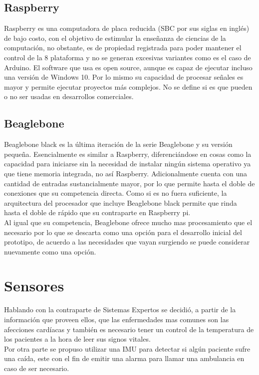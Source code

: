 \subsection{Raspberry}
Raspberry es una computadora de placa reducida (SBC por sus siglas en inglés) de bajo costo, con el objetivo de estimular la enseñanza de ciencias de la computación, no obstante, es de propiedad registrada para poder mantener el control de la 8 plataforma y no se generan excesivas variantes como es el caso de Arduino. El software que usa es open source, aunque es capaz de ejecutar incluso una versión de Windows 10. Por lo mismo su capacidad de procesar señales es mayor y permite ejecutar proyectos más complejos. No se define si es que pueden o no ser usadas en desarrollos comerciales.

\newpage
\subsection{Beaglebone}
Beaglebone black es la última iteración de la serie Beaglebone y su versión pequeña. Esencialmente es similar a Raspberry, diferenciándose en cosas como la capacidad para iniciarse sin la necesidad de instalar ningún sistema operativo ya que tiene memoria integrada, no así Raspberry. Adicionalmente cuenta con una cantidad de entradas sustancialmente mayor, por lo que permite hasta el doble de conexiones que su competencia directa. Como si es no fuera suficiente, la arquitectura del procesador que incluye Beaglebone black permite que rinda hasta el doble de rápido que su contraparte en Raspberry pi. \\
Al igual que su competencia, Beaglebone ofrece mucho mas procesamiento que el necesario por lo que se descarta como una opción para el desarrollo inicial del prototipo, de acuerdo a las necesidades que vayan surgiendo se puede considerar nuevamente como una opción.
\newpage
\section{Sensores}
Hablando con la contraparte de Sistemas Expertos se decidió, a partir de la información que proveen ellos, que las enfermedades  mas comunes son las afecciones cardíacas y también es necesario tener un control de la temperatura de los pacientes a la hora de leer sus signos vitales. \\
Por otra parte se propuso utilizar una IMU para detectar si algún paciente sufre una caída, este con el fin de emitir una alarma para llamar una ambulancia en caso de ser necesario.
